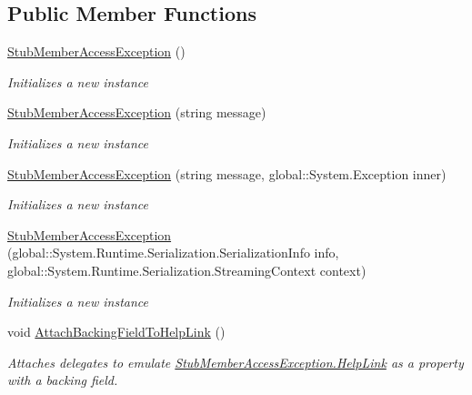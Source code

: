 \subsection*{Public Member Functions}
\begin{DoxyCompactItemize}
\item 
\hyperlink{class_system_1_1_fakes_1_1_stub_member_access_exception_a5575a2b58a620f7f221fab5acbd53bfa}{Stub\-Member\-Access\-Exception} ()
\begin{DoxyCompactList}\small\item\em Initializes a new instance\end{DoxyCompactList}\item 
\hyperlink{class_system_1_1_fakes_1_1_stub_member_access_exception_a679e4873a72c45ec254bca32acc0fded}{Stub\-Member\-Access\-Exception} (string message)
\begin{DoxyCompactList}\small\item\em Initializes a new instance\end{DoxyCompactList}\item 
\hyperlink{class_system_1_1_fakes_1_1_stub_member_access_exception_a9f0e59f0b77f3b394a04f7fa689e032d}{Stub\-Member\-Access\-Exception} (string message, global\-::\-System.\-Exception inner)
\begin{DoxyCompactList}\small\item\em Initializes a new instance\end{DoxyCompactList}\item 
\hyperlink{class_system_1_1_fakes_1_1_stub_member_access_exception_ab146af6592c2c74a5274be41184aed38}{Stub\-Member\-Access\-Exception} (global\-::\-System.\-Runtime.\-Serialization.\-Serialization\-Info info, global\-::\-System.\-Runtime.\-Serialization.\-Streaming\-Context context)
\begin{DoxyCompactList}\small\item\em Initializes a new instance\end{DoxyCompactList}\item 
void \hyperlink{class_system_1_1_fakes_1_1_stub_member_access_exception_a8edb4e57ffa5d7cb23c01f23ed80bff3}{Attach\-Backing\-Field\-To\-Help\-Link} ()
\begin{DoxyCompactList}\small\item\em Attaches delegates to emulate \hyperlink{class_system_1_1_fakes_1_1_stub_member_access_exception_a95cf4903b64a0fa85490936468426b87}{Stub\-Member\-Access\-Exception.\-Help\-Link} as a property with a backing field.\end{DoxyCompactList}\item 

\end{DoxyCompactItemize}
